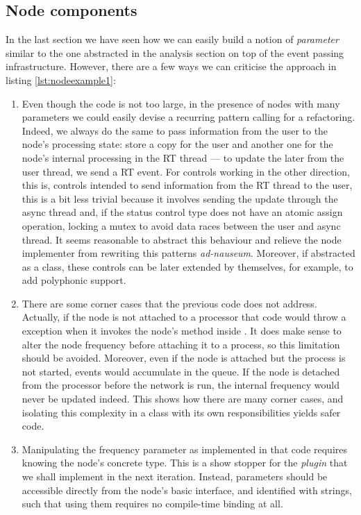 \subsection{Node components}

In the last section we have seen how we can easily build a notion of
\emph{parameter} similar to the one abstracted in the
analysis section on top of the event passing infrastructure. However,
there are a few ways we can criticise the approach in listing
\ref{lst:nodeexample1}:
\begin{enumerate}
\item Even though the code is not too large, in the presence of nodes
  with many parameters we could easily devise a recurring pattern
  calling for a refactoring. Indeed, we always do the same to pass
  information from the user to the node's processing state: store a
  copy for the user and another one for the node's internal processing
  in the RT thread --- to update the later from the user thread, we
  send a RT event. For controls working in the other direction, this
  is, controls intended to send information from the RT thread to the
  user, this is a bit less trivial because it involves sending the
  update through the async thread and, if the status control type does
  not have an atomic assign operation, locking a mutex to avoid data
  races between the user and async thread. It seems reasonable to
  abstract this behaviour and relieve the node implementer from
  rewriting this patterns \emph{ad-nauseum}. Moreover, if abstracted
  as a class, these controls can be later extended by themselves, for
  example, to add polyphonic support.

\item There are some corner cases that the previous code does not
  address. Actually, if the node is not attached to a processor that
  code would throw a  exception when it
  invokes the node's  method inside
  . It does make sense to alter the node
  frequency before attaching it to a process, so this limitation
  should be avoided. Moreover, even if the node is attached but the
  process is not started, events would accumulate in the queue. If the
  node is detached from the processor before the network is run, the
  internal frequency would never be updated indeed. This shows how
  there are many corner cases, and isolating this complexity in a
  class with its own responsibilities yields safer code.

\item Manipulating the frequency parameter as implemented in that code
  requires knowing the node's concrete type. This is a show stopper
  for the \emph{plugin} that we shall implement in the next
  iteration. Instead, parameters should be accessible directly from
  the node's basic interface, and identified with strings, such that
  using them requires no compile-time binding at all.
\end{enumerate}

